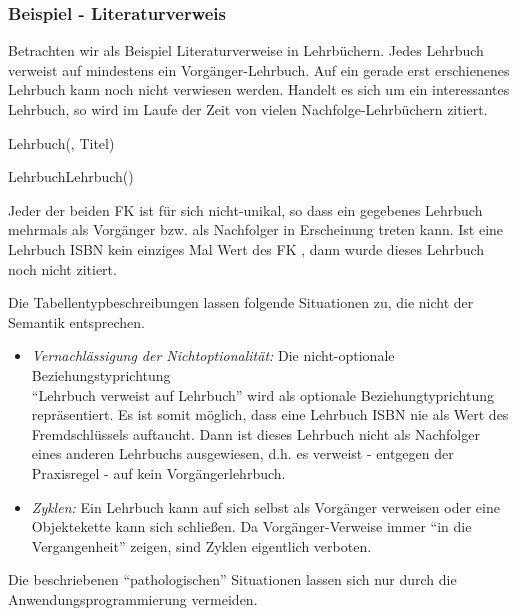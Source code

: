         \subsubsection{Beispiel - Literaturverweis}
          Betrachten wir als Beispiel Literaturverweise in Lehrb\"uchern. Jedes Lehrbuch verweist auf mindestens ein Vorg\"anger-Lehrbuch. Auf ein gerade erst erschienenes Lehrbuch kann noch nicht verwiesen werden. Handelt es sich um ein interessantes Lehrbuch, so wird im Laufe der Zeit von vielen Nachfolge-Lehrb\"uchern zitiert.
          \begin{center}
          \end{center}
        \begin{small}
          Lehrbuch(, Titel)

          LehrbuchLehrbuch()
        \end{small}

          Jeder der beiden FK ist f\"ur sich nicht-unikal, so dass ein gegebenes Lehrbuch mehrmals als Vorg\"anger bzw. als Nachfolger in Erscheinung treten kann. Ist eine Lehrbuch ISBN kein einziges Mal Wert des FK , dann wurde dieses Lehrbuch noch nicht zitiert.

          Die Tabellentypbeschreibungen lassen folgende Situationen zu, die nicht der Semantik entsprechen.
          \begin{itemize}
            \item \textit{Vernachl\"assigung der Nichtoptionalit\"at:} Die nicht-optionale Beziehungstyprichtung\\ \enquote{Lehrbuch verweist auf Lehrbuch} wird als optionale Beziehungtyprichtung repr\"asentiert. Es ist somit m\"oglich, dass eine Lehrbuch ISBN nie als Wert des Fremdschl\"ussels  auftaucht. Dann ist dieses Lehrbuch nicht als Nachfolger eines anderen Lehrbuchs ausgewiesen, d.h. es verweist - entgegen der Praxisregel - auf kein Vorg\"angerlehrbuch.
            \item \textit{Zyklen:} Ein Lehrbuch kann auf sich selbst als Vorg\"anger verweisen oder eine Objektekette kann sich schlie\ss en. Da Vorg\"anger-Verweise immer \enquote{in die Vergangenheit} zeigen, sind Zyklen eigentlich verboten.
          \end{itemize}
          Die beschriebenen \enquote{pathologischen} Situationen lassen sich nur durch die Anwendungsprogrammierung vermeiden.
